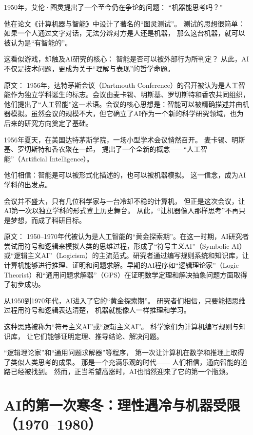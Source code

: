 1950年，艾伦·图灵提出了一个至今仍在争论的问题：
“机器能思考吗？”

他在论文《计算机器与智能》中设计了著名的“图灵测试”。
测试的思想很简单：
如果一个人通过文字对话，无法分辨对方是人还是机器，
那么这台机器，就可以被认为是“有智能的”。

这看似游戏，却触及AI研究的核心：
智能是否可以被外部行为所判定？
从此，AI不仅是技术问题，更成为关于“理解与表现”的哲学命题。

原文：
1956年，达特茅斯会议（Dartmouth Conference）的召开被认为是人工智能作为独立学科诞生的标志。会议由麦卡锡、明斯基、罗切斯特和香农共同组织，他们提出了“人工智能”这一术语。会议的核心思想是：智能可以被精确描述并由机器模拟。虽然会议的规模不大，但它确立了AI作为一个新的科学研究领域，也为后来的研究方向奠定了基础。

1956年夏天，在美国达特茅斯学院，一场小型学术会议悄然召开。
麦卡锡、明斯基、罗切斯特和香农聚在一起，
提出了一个全新的概念——“人工智能”（Artificial Intelligence）。

他们相信：智能是可以被形式化描述的，也可以被机器模拟。
这一信念，成为AI学科的出发点。

会议并不盛大，只有几位科学家与一台冷却不稳的计算机，
但正是这次会议，让AI第一次以独立学科的形式登上历史舞台。
从此，“让机器像人那样思考”不再只是梦想，而成了科研目标。

原文：
1950–1970年代被认为是人工智能的“黄金探索期”。在这一时期，AI研究者尝试用符号和逻辑来模拟人类的思维过程，形成了“符号主义AI”（Symbolic AI）或“逻辑主义AI”（Logicism）的主流范式。研究者通过编写规则系统和知识库，让计算机能够进行推理、证明和问题求解。早期的AI程序如“逻辑理论家”（Logic Theorist）和“通用问题求解器”（GPS）在证明数学定理和解决抽象问题方面取得了初步成功。

从1950到1970年代，AI进入了它的“黄金探索期”。
研究者们相信，只要能把思维过程用符号和逻辑表达清楚，
机器就能像人一样推理和学习。

这种思路被称为“符号主义AI”或“逻辑主义AI”。
科学家们为计算机编写规则与知识库，
让它们能够证明定理、推导结论、解决问题。

“逻辑理论家”和“通用问题求解器”等程序，
第一次让计算机在数学和推理上取得了类似人类思考的成果。
那是一个充满乐观的时代——
人们相信，通向智能的道路已经被找到。
然而，正当希望高涨时，AI也悄然迎来了它的第一个瓶颈。

\section{AI的第一次寒冬：理性遇冷与机器受限（1970–1980）}

